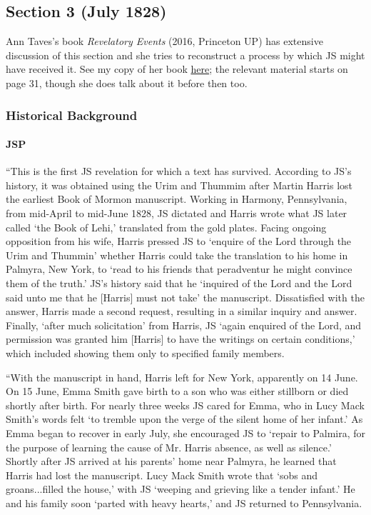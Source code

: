 \subsection{Section 3 (July 1828)}
	\label{DC3}
	
	Ann Taves's book \textit{Revelatory Events} (2016, Princeton UP) has extensive discussion of this section and she tries to reconstruct a process by which JS might have received it. See my copy of her book \href{https://drive.google.com/file/d/1LfyadWG4dd4Q0FD_upWx8ULnlFvvRWKJ/view?usp=sharing}{here}; the relevant material starts on page 31, though she does talk about it before then too.
	
	\subsubsection{Historical Background}
		\label{DC3-HB}
		
		\paragraph{JSP}
		
			``This is the first JS revelation for which a text has survived. According to JS's history, it was obtained using the Urim and Thummim after Martin Harris lost the earliest Book of Mormon manuscript. Working in Harmony, Pennsylvania, from mid-April to mid-June 1828, JS dictated and Harris wrote what JS later called `the Book of Lehi,' translated from the gold plates. Facing ongoing opposition from his wife, Harris pressed JS to `enquire of the Lord through the Urim and Thummin' whether Harris could take the translation to his home in Palmyra, New York, to `read to his friends that peradventur he might convince them of the truth.' JS's history said that he `inquired of the Lord and the Lord said unto me that he [Harris] must not take' the manuscript. Dissatisfied with the answer, Harris made a second request, resulting in a similar inquiry and answer. Finally, `after much solicitation' from Harris, JS `again enquired of the Lord, and permission was granted him [Harris] to have the writings on certain conditions,' which included showing them only to specified family members.
			
			``With the manuscript in hand, Harris left for New York, apparently on 14 June. On 15 June, Emma Smith gave birth to a son who was either stillborn or died shortly after birth. For nearly three weeks JS cared for Emma, who in Lucy Mack Smith's words felt `to tremble upon the verge of the silent home of her infant.' As Emma began to recover in early July, she encouraged JS to `repair to Palmira, for the purpose of learning the cause of Mr. Harris absence, as well as silence.' Shortly after JS arrived at his parents' home near Palmyra, he learned that Harris had lost the manuscript. Lucy Mack Smith wrote that `sobs and groans...filled the house,' with JS `weeping and grieving like a tender infant.' He and his family soon `parted with heavy hearts,' and JS returned to Pennsylvania.
			
